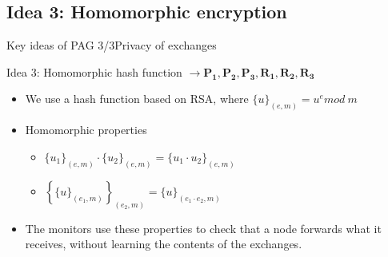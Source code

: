 \documentclass[10pt]{beamer}
\begin{document}
\subsection{Idea 3: Homomorphic encryption}
\begin{frame}{Key ideas of PAG 3/3}{Privacy of exchanges}
  \begin{block}{Idea 3: Homomorphic hash function $\longrightarrow \mathbf{P_1}, \mathbf{P_2}, \mathbf{P_3}, \mathbf{R_1}, \mathbf{R_2}, \mathbf{R_3} $}
  \begin{itemize}
  \item We use a hash function based on RSA, where $\{u\}_{(e,m)} = u^e mod\ m$
  \vspace{5mm}
  \item Homomorphic properties
  \begin{itemize}
  \item $\{u_1\}_{(e,m)} \cdot \{u_2\}_{(e,m)}  = \{u_1 \cdot u_2\}_{(e,m)}$ 
  \item $\left\{ \{u\}_{(e_1,m)} \right\}_{(e_2, m)} = \{u\}_{(e_1 \cdot e_2,m)}$
  \end{itemize}
  \vspace{5mm}
  \item The monitors use these properties to check that a node forwards what it receives, without learning the contents of the exchanges.
  \end{itemize}
  \end{block}
\end{frame}

\end{document}
